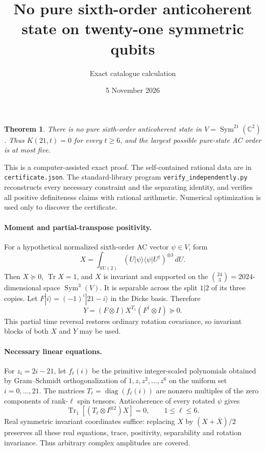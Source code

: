 \documentclass[11pt]{article}
\newtheorem{theorem}{Theorem}
\newcommand{\Tr}{\operatorname{Tr}}
\begin{document}
\title{No pure sixth-order anticoherent state on twenty-one symmetric qubits}
\author{Exact catalogue calculation}
\date{5 November 2026}
\maketitle
\begin{theorem}
There is no pure sixth-order anticoherent state in $V=\operatorname{Sym}^{21}(\mathbb C^2)$. Thus $K(21,t)=0$ for every $t\ge6$, and the largest possible pure-state AC order is at most five.
\end{theorem}
This is a computer-assisted exact proof. The self-contained rational data are in \texttt{certificate.json}. The standard-library program \texttt{verify\_independently.py} reconstructs every necessary constraint and the separating identity, and verifies all positive definiteness claims with rational arithmetic. Numerical optimization is used only to discover the certificate.

\paragraph{Moment and partial-transpose positivity.}
For a hypothetical normalized sixth-order AC vector $\psi\in V$, form
\[
X=\int_{\mathrm{SU}(2)}(U|\psi\rangle\langle\psi|U^\dagger)^{\otimes3}\,dU.
\]
Then $X\succeq0$, $\Tr X=1$, and $X$ is invariant and supported on the $\binom{24}{3}=2024$-dimensional space $\operatorname{Sym}^{3}(V)$. It is separable across the split $1|2$ of its three copies. Let $F|i\rangle=(-1)^i|21-i\rangle$ in the Dicke basis. Therefore
\[
Y=(F\otimes I)X^{T_1}(F^\dagger\otimes I)\succeq0.
\]
This partial time reversal restores ordinary rotation covariance, so invariant blocks of both $X$ and $Y$ may be used.

\paragraph{Necessary linear equations.}
For $z_i=2i-21$, let $f_\ell(i)$ be the primitive integer-scaled polynomials obtained by Gram--Schmidt orthogonalization of $1,z,z^2,\ldots,z^6$ on the uniform set $i=0,\ldots,21$. The matrices $T_\ell=\operatorname{diag}(f_\ell(i))$ are nonzero multiples of the zero components of rank-$\ell$ spin tensors. Anticoherence of every rotated $\psi$ gives
\[
\Tr_1[(T_\ell\otimes I^{\otimes2})X]=0,\qquad1\le\ell\le6.
\]
Real symmetric invariant coordinates suffice: replacing $X$ by $(X+\overline X)/2$ preserves all these real equations, trace, positivity, separability and rotation invariance. Thus arbitrary complex amplitudes are covered.
\end{document}
